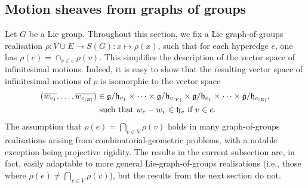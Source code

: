 \documentclass{article}
\theoremstyle{definition}
\theoremstyle{remark}
\begin{document}
\subsection{Motion sheaves from graphs of groups}\label{sec: basics}

Let $G$ be a Lie group. Throughout this section, we fix a Lie graph-of-groups realisation $\rho: V\cup E\rightarrow S(G): x\mapsto \rho(x)$, such that for each hyperedge $e$, one has $\rho(e) = \cap_{v\in e} \rho(v)$. This simplifies the description of the vector space of infinitesimal motions. Indeed, it is easy to show that the resulting vector space of infinitesimal motions of $\rho$ is isomorphic to the vector space 
\begin{align*}
     (\overline{w_{v_1}}, \dots, \overline{w_{e_{|E|}}} )  &\in \mathfrak{g}/\mathfrak{h}_{v_1}  \times \dots \times \mathfrak{g}/\mathfrak{h}_{v_{|V|}} \times \mathfrak{g}/\mathfrak{h}_{e_1}  \times \dots \times \mathfrak{g}/\mathfrak{h}_{e_{|E|}},  \\
    &\textup{ such that } w_{e} - w_{v} \in \mathfrak{h}_v \text{ if }v \in e. 
\end{align*}
 The assumption that $\rho(e) = \bigcap_{v\in V} \rho(v)$ holds in many  graph-of-groups realisations arising from combinatorial-geometric problems, with a notable exception being projective rigidity. The results in the current subsection are, in fact, easily adaptable to more general Lie-graph-of-groups realisations (i.e., those where $\rho(e) \neq \bigcap_{v\in V} \rho(v)$), but the results from the next section do not. 
 
\end{document}
